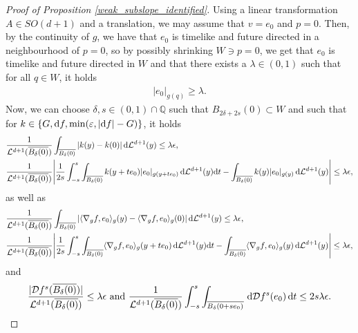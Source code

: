 \documentclass[a4paper,10pt]{article}
\numberwithin{equation}{section}
\newcommand{\Q}{\mathbb{Q}}
\newcommand{\e}{\varepsilon}
\newcommand{\di}{{\rm d}}
\begin{document}
\begin{proof}[Proof of Proposition \ref{weak_subslope_identified}]
    Using a linear transformation $A \in SO(d+1)$ and a translation, we may assume that $v= e_0$ and $p = 0$. Then, by the continuity of $g$, we have that $e_0$ is timelike and future directed in a neighbourhood of $p=0$, so by possibly shrinking $W \ni p=0$, we get that $e_0$ is timelike and future directed in $W$ and that there exists a $\lambda \in (0,1)$ such that for all $q \in W$, it holds
    \begin{align}\label{lambda_minimal_lor_length_e_0}
        |e_0|_{g(q)} \geq \lambda.
    \end{align}
    Now, we can choose $\delta, s \in (0,1)\cap \Q$ such that $B_{2\delta+2s}(0) \subset W$ and such that for $k \in \{G, \di f, \min(\e, |\di f|-G)\}$, it holds  
    \begin{align}
       &\frac{1}{\mathcal{L}^{d+1}(\overline{B_\delta(0)})}\int_{\overline{B_\delta(0)}} |k(y)-k(0)| \, \di \mathcal{L}^{d+1}(y) \leq \lambda \epsilon, \label{lebesgue_for_k} \\
       &\frac{1}{\mathcal{L}^{d+1}(\overline{B_\delta(0)})} \Bigg|\frac{1}{2s}\int_{-s}^s\int_{\overline{B_\delta(0)}} k(y+te_0)|e_0|_{g(y+te_0)} \, \di \mathcal{L}^{d+1}(y) \di t - \int_{\overline{B_\delta(0)}} k(y)|e_0|_{g(y)} \, \di \mathcal{L}^{d+1}(y) \Bigg| \leq \lambda \epsilon, \label{lebesgue_advanced_for_k}
    \end{align}
as well as 
 \begin{align}
       &\frac{1}{\mathcal{L}^{d+1}(\overline{B_\delta(0)})}\int_{\overline{B_\delta(0)}} |\langle \nabla_g f, e_0\rangle_g(y)-\langle \nabla_g f, e_0\rangle_g(0)| \, \di \mathcal{L}^{d+1}(y) \leq \lambda \epsilon, \label{lebesgue_inner_prod} \\
       &\frac{1}{\mathcal{L}^{d+1}(\overline{B_\delta(0)})} \Bigg|\frac{1}{2s}\int_{-s}^s\int_{\overline{B_\delta(0)}} \langle \nabla_g f, e_0\rangle_g(y+te_0) \, \di \mathcal{L}^{d+1}(y) \di t - \int_{\overline{B_\delta(0)}} \langle \nabla_g f, e_0\rangle_g(y) \, \di \mathcal{L}^{d+1}(y) \Bigg| \leq \lambda \epsilon, \label{lebesgue_inner_prod_advanced}
    \end{align}
and  
\begin{align}\label{lebesgue_assumption_for_dfs}
    \frac{|\mathcal{D}f^s(\overline{B_\delta(0)})|}{\mathcal{L}^{d+1}(\overline{B_\delta(0)})} \leq \lambda
    \epsilon\  \mathrm{and}\ \frac{1}{\mathcal{L}^{d+1}(\overline{B_\delta(0)})}\int_{-s}^s \int_{\overline{B_\delta(0+se_0)}} \, \di \mathcal{D}f^s(e_0)\,  \di t \leq 2s\lambda\epsilon. 
\end{align}

\end{proof}
\end{document}
